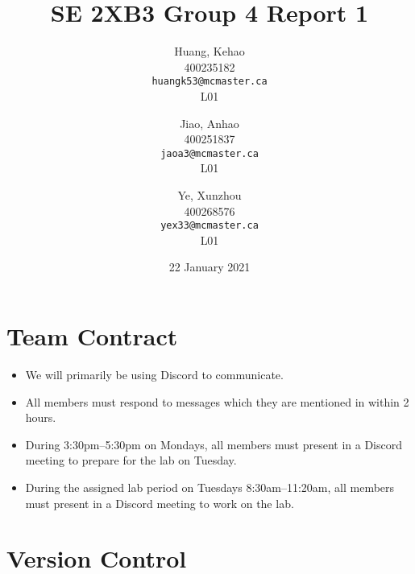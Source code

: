\documentclass[titlepage, 12pt]{article}
\title{SE 2XB3 Group 4 Report 1}
\author{
  Huang, Kehao \\
  400235182 \\
  \texttt{huangk53@mcmaster.ca} \\
  L01
  \and
  Jiao, Anhao \\
  400251837 \\
  \texttt{jaoa3@mcmaster.ca} \\
  L01
  \and
  Ye, Xunzhou \\
  400268576 \\
  \texttt{yex33@mcmaster.ca} \\
  L01
}
\date{22 January 2021}
\begin{document}
\maketitle{}

\section*{Team Contract}
\label{sec:contract}

\begin{itemize}
\item We will primarily be using Discord to communicate.
\item All members must respond to messages which they are mentioned in within 2
  hours.
\item During 3:30pm--5:30pm on Mondays, all members must present in a Discord
  meeting to prepare for the lab on Tuesday.
\item During the assigned lab period on Tuesdays 8:30am--11:20am, all members
  must present in a Discord meeting to work on the lab.
\end{itemize}

\newpage{}

\section{Version Control}
\label{sec:git}
\end{document}
